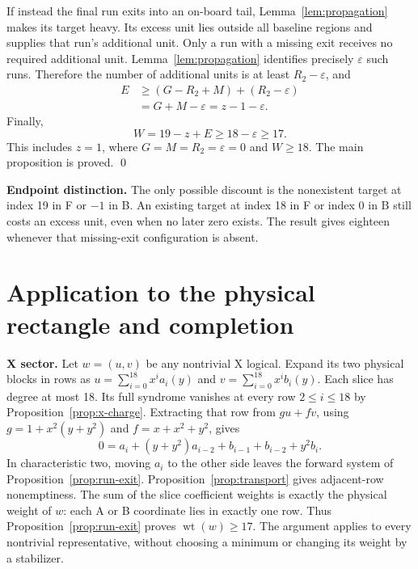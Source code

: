 \documentclass{article}
\DeclareMathOperator{\wt}{wt}
\begin{document}
If instead the final run exits into an on-board tail, Lemma~\ref{lem:propagation} makes its
target heavy. Its excess unit lies outside all baseline regions and supplies that run's
additional unit. Only a run with a missing exit receives no required additional unit.
Lemma~\ref{lem:propagation} identifies precisely \(\varepsilon\) such runs. Therefore the
number of additional units is at least \(R_2 - \varepsilon\), and
\begin{equation}
  \begin{aligned}
    E &\ge (G - R_2 + M) + (R_2 - \varepsilon) \\
      &= G + M - \varepsilon = z - 1 - \varepsilon.
  \end{aligned}
\end{equation}
Finally,
\begin{equation}
  W = 19 - z + E \ge 18 - \varepsilon \ge 17.
\end{equation}
This includes \(z = 1\), where \(G = M = R_2 = \varepsilon = 0\) and \(W \ge 18\). The main
proposition is proved. \qed

\textbf{Endpoint distinction.} The only possible discount is the nonexistent target at index
19 in F or \(-1\) in B. An existing target at index 18 in F or index 0 in B still costs an
excess unit, even when no later zero exists. The result gives eighteen whenever that
missing-exit configuration is absent.

\section{Application to the physical rectangle and completion}\label{sec:application}

\textbf{X sector.} Let \(w = (u,v)\) be any nontrivial X logical. Expand its two physical
blocks in rows as \(u = \sum_{i=0}^{18} x^i a_i(y)\) and \(v = \sum_{i=0}^{18} x^i b_i(y)\).
Each slice has degree at most 18. Its full syndrome vanishes at every row
\(2 \le i \le 18\) by Proposition~\ref{prop:x-charge}. Extracting that row from \(gu + fv\), using
\(g = 1 + x^2(y + y^2)\) and \(f = x + x^2 + y^2\), gives
\begin{equation}
  0 = a_i + (y + y^2) a_{i-2} + b_{i-1} + b_{i-2} + y^2 b_i.
\end{equation}
In characteristic two, moving \(a_i\) to the other side leaves the forward system of
Proposition~\ref{prop:run-exit}. Proposition~\ref{prop:transport} gives adjacent-row nonemptiness. The
sum of the slice coefficient weights is exactly the physical weight of \(w\): each A or B
coordinate lies in exactly one row. Thus Proposition~\ref{prop:run-exit} proves
\(\wt(w) \ge 17\). The argument applies to every nontrivial representative, without choosing
a minimum or changing its weight by a stabilizer.
\end{document}
